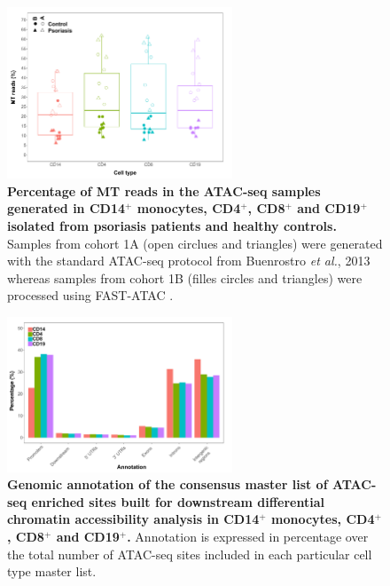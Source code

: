 \begin{figure}[htbp]
\centering
\includegraphics[width=0.6\textwidth]{./Appendix/pdfs/Chapter4/ATAC_PS_CTL_MT_percent_boxplot}
\caption[Percentage of MT reads in the ATAC-seq libraries generated in CD14$^+$ monocytes, CD4$^+$, CD8$^+$ and CD19$^+$ isolated from psoriasis patients and healthy controls.]{\textbf{Percentage of MT reads in the ATAC-seq samples generated in CD14$^+$ monocytes, CD4$^+$, CD8$^+$ and CD19$^+$ isolated from psoriasis patients and healthy controls.} Samples from cohort 1A (open circlues and triangles) were generated with the standard ATAC-seq protocol from Buenrostro \textit{et al.}, 2013 whereas samples from cohort 1B (filles circles and triangles) were processed using FAST-ATAC \parencite{Corces2016}.}
\label{fig:ATAC_PS_CTL_MT_percent}
\end{figure}


\begin{figure}[htbp]
\centering
\includegraphics[width=0.6\textwidth]{./Appendix/pdfs/Chapter4/ATAC_all_cell_types_individual_master_lists_general_peak_annotation}
\caption[Genomic annotation of the consensus master list of ATAC-seq enriched sites built for downstream differential chromatin accessibility analysis in CD14$^+$ monocytes, CD4$^+$, CD8$^+$ and CD19$^+$.]{\textbf{Genomic annotation of the consensus master list of ATAC-seq enriched sites built for downstream differential chromatin accessibility analysis in CD14$^+$ monocytes, CD4$^+$, CD8$^+$ and CD19$^+$.} Annotation is expressed in percentage over the total number of ATAC-seq sites included in each particular cell type master list.}
\label{fig:ATAC_PS_CTL_genomic_annotation}
\end{figure}


